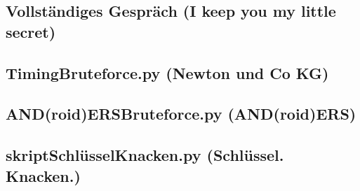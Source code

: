 \documentclass[12pt, a4paper, titlepage, oneside]{scrartcl}
\begin{document}
	\subsection{Vollständiges Gespräch (I keep you my little secret)}
	

	\subsection{TimingBruteforce.py (Newton und Co KG)}
	

    \subsection{AND(roid)ERSBruteforce.py (AND(roid)ERS)}
    

	\subsection{skriptSchlüsselKnacken.py (Schlüssel. Knacken.)}
	

\end{document}

